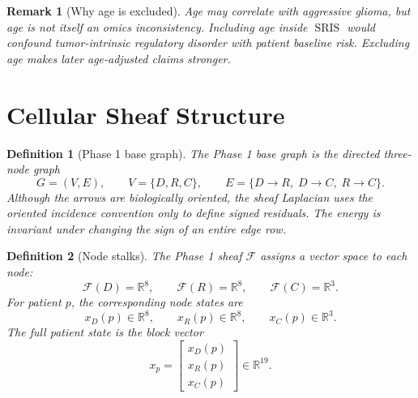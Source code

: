\documentclass[11pt]{article}
\newtheorem{definition}{Definition}[section]
\newtheorem{remark}{Remark}[section]
\newcommand{\R}{\mathbb{R}}
\newcommand{\F}{\mathcal{F}}
\newcommand{\SRIS}{\operatorname{SRIS}}
\begin{document}
\begin{remark}[Why age is excluded]
Age may correlate with aggressive glioma, but age is not itself an omics inconsistency.  Including age inside $\SRIS$ would confound tumor-intrinsic regulatory disorder with patient baseline risk.  Excluding age makes later age-adjusted claims stronger.
\end{remark}

\section{Cellular Sheaf Structure}

\begin{definition}[Phase 1 base graph]
The Phase 1 base graph is the directed three-node graph
\[
G=(V,E),\qquad V=\{D,R,C\},\qquad E=\{D\to R,\;D\to C,\;R\to C\}.
\]
Although the arrows are biologically oriented, the sheaf Laplacian uses the oriented incidence convention only to define signed residuals.  The energy is invariant under changing the sign of an entire edge row.
\end{definition}

\begin{center}
\end{center}

\begin{definition}[Node stalks]
The Phase 1 sheaf $\F$ assigns a vector space to each node:
\[
\F(D)=\R^{8},\qquad \F(R)=\R^{8},\qquad \F(C)=\R^{3}.
\]
For patient $p$, the corresponding node states are
\[
x_D(p)\in\R^8,
\qquad
x_R(p)\in\R^8,
\qquad
x_C(p)\in\R^3.
\]
The full patient state is the block vector
\[
x_p=\begin{bmatrix}x_D(p)\\x_R(p)\\x_C(p)\end{bmatrix}\in\R^{19}.
\]
\end{definition}
\end{document}
